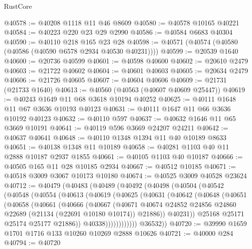\begin{lexlean}{RustCore}
\begin{coremodule}
@40578 := @40208 @1118 @11 @46 @8609
@40580 := @40578 @10165 @40221
@40584 := @40223 @220 @23 @29 @2990
@40586 := @40584 @6683 @40304
@40590 := @40110 @218 @165 @23 @28
@40598 := @40571 (@40574 (@40580 (@40586 (@40590 @6578 @2934 @40530 @40231))))
@40599 := @20539 @1640
@40600 := @20736 @40599
@40601 := @40598 @40600
@40602 := @20610 @2479
@40603 := @21722 @40602
@40604 := @40601 @40603
@40605 := @20634 @2479
@40606 := @21726 @40605
@40607 := @40604 @40606
@40609 := @21731 (@21733 @1640)
@40613 := @40560 (@40563 (@40607 @40609 @25447))
@40619 := @40243 @1649 @11 @68 @3618 @10194 @40252
@40625 := @40111 @1648 @11 @67 @3636 @10193 @40123
@40631 := @40111 @1647 @11 @66 @3636 @10192 @40123
@40632 := @40110 @597
@40637 := @40632 @1646 @11 @65 @3669 @10191
@40641 := @40119 @596 @3669 @24207 @24211
@40642 := @40637 @40641
@40648 := @40110 @1348 @1394 @11 @40 @10189 @8633
@40651 := @40138 @1348 @11 @10189
@40658 := @40281 @1103 @40 @11 @2888 @10187 @2937 @1855
@40661 := @40105 @1103 @40 @10187
@40666 := @40505 @165 @11 @28 @10185 @2934
@40667 := @40512 @10185
@40671 := @40518 @3009 @3067 @10173 @10180
@40674 := @40525 @3009 @40528 @23624
@40712 := @40479
    (@40483
      (@40489
        (@40492
          (@40498
            (@40504
              (@40542
                (@40548
                  (@40554
                    (@40613
                      (@40619
                        (@40625
                          (@40631
                            (@40642
                              (@40648
                                (@40651
                                  (@40658
                                    (@40661
                                      (@40666
                                        (@40667
                                          (@40671
                                            @40674
                                            @24852
                                            @24856
                                            @24860
                                            @22689
                                            (@21134 (@22691 @10180 @10174))
                                            @21886))
                                        @40231))
                                    @25168
                                    @25171
                                    @25174
                                    @25177
                                    @21886))
                                @40338))))))))))))
        @36532))
@40720 := @39990 @1659 @1701 @1716 @133 @10260 @10269 @2888 @10626
@40721 := @40000 @284
@40794 := @40720

\end{coremodule}
\end{lexlean}
